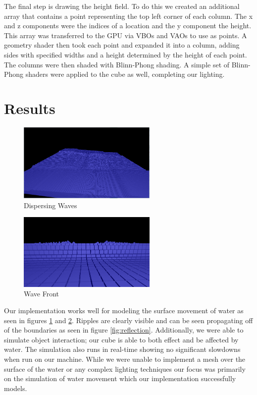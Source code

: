 \documentclass[11pt]{article}
\begin{document}
The final step is drawing the height field. To do this we created an additional 
array that contains a point representing the top left corner of each column. 
The x and z components were the indices of a location and the y component the 
height. This array was transferred to the GPU via VBOs and VAOs to use as 
points. A geometry shader then took each point and expanded it into a column, 
adding sides with specified widths and a height determined by the height of 
each point. The columns were then shaded with Blinn-Phong shading. A simple set 
of Blinn-Phong shaders were applied to the cube as well, completing our 
lighting.

\section{Results}

\begin{figure}[H]
    \caption{Dispersing Waves}
    \label{fig:waves}
    \centering
    \includegraphics[width=0.6\textwidth]{../www/images/waterWaves}
\end{figure}

\begin{figure}[H]
    \caption{Wave Front}
    \label{fig:front}
    \centering
    \includegraphics[width=0.6\textwidth]{../www/images/waveFront}
\end{figure}

Our implementation works well for modeling the surface movement of water as 
seen in figures \ref{fig:waves} and \ref{fig:front}. Ripples are clearly 
visible and can be seen propagating off of the boundaries as seen in figure 
\ref{fig:reflection}. Additionally, we were able to simulate object 
interaction; our cube is able to both effect and be affected by water. The 
simulation also runs in real-time showing no significant slowdowns when run on 
our machine. While we were unable to implement a mesh over the surface of the 
water or any complex lighting techniques our focus was primarily on the 
simulation of water movement which our implementation successfully models.
\end{document}
